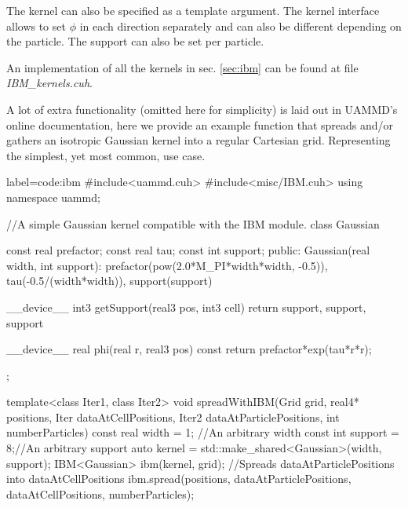\documentclass[ twoside,openright,titlepage,numbers=noenddot,%
headinclude,footinclude,cleardoublepage=empty,abstract=on,
BCOR=5mm,paper=b5,fontsize=11pt, dvipsnames
]{scrreprt}
\newcommand{\uammd}{\gls{UAMMD}\xspace}
\begin{document}
The kernel can also be specified as a template argument. The kernel interface allows to set $\phi$ in each direction separately and can also be different depending on the particle. The support can also be set per particle.

An implementation of all the kernels in sec. \ref{sec:ibm} can be found at file \emph{IBM\_kernels.cuh}.

A lot of extra functionality (omitted here for simplicity) is laid out in \uammd's online documentation, here we provide an example function that spreads and/or gathers an isotropic Gaussian kernel into a regular Cartesian grid. Representing the simplest, yet most common, use case.

\begin{code2}  {label=code:ibm}
#include<uammd.cuh>
#include<misc/IBM.cuh>
using namespace uammd;

//A simple Gaussian kernel compatible with the IBM module.
class Gaussian{
  const real prefactor;
  const real tau;
  const int support;
public:
  Gaussian(real width, int support):
    prefactor(pow(2.0*M_PI*width*width, -0.5)),
    tau(-0.5/(width*width)),
    support(support){}

  __device__ int3 getSupport(real3 pos, int3 cell){
    return {support, support, support}
  }

  __device__ real phi(real r, real3 pos) const{
    return prefactor*exp(tau*r*r);
  }
};

template<class Iter1, class Iter2>
void spreadWithIBM(Grid grid, real4* positions,
                   Iter dataAtCellPositions,
                   Iter2 dataAtParticlePositions,
                   int numberParticles){
  const real width = 1; //An arbitrary width
  const int support = 8;//An arbitrary support
  auto kernel = std::make_shared<Gaussian>(width, support);
  IBM<Gaussian> ibm(kernel, grid);
  //Spreads dataAtParticlePositions into dataAtCellPositions
  ibm.spread(positions, dataAtParticlePositions, dataAtCellPositions, numberParticles);
}


\end{code2}
\end{document}

